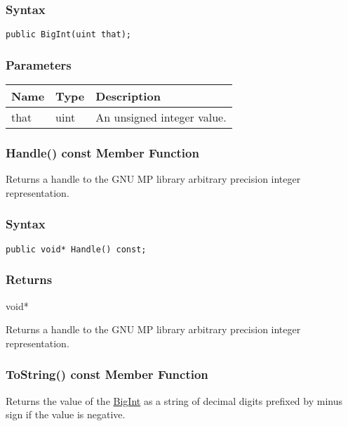 \documentclass[a4paper,oneside,11.000000pt]{book}
\begin{document}
\subsubsection*{Syntax}\texttt{public BigInt(uint that);}

\subsubsection*{Parameters}
\begin{flushleft}
\begin{supertabular}[l]{lll}
\textbf{Name}
& \textbf{Type}
& \textbf{Description}
\\
\hline
that
& uint
& An unsigned integer value.

\\
\end{supertabular}

\end{flushleft}
\clearpage

\hypertarget{System.Numerics.Multiprecision.BigInt.Handle.C.P.System.Numerics.Multiprecision.BigInt}{\subsubsection*{Handle() const Member Function}}
\begin{flushleft}
Returns a handle to the GNU MP library arbitrary precision integer representation.

\end{flushleft}
\subsubsection*{Syntax}\texttt{public void* Handle() const;}

\subsubsection*{Returns}void*
\begin{flushleft}
Returns a handle to the GNU MP library arbitrary precision integer representation.

\end{flushleft}
\clearpage

\hypertarget{System.Numerics.Multiprecision.BigInt.ToString.C.P.System.Numerics.Multiprecision.BigInt}{\subsubsection*{ToString() const Member Function}}
\begin{flushleft}
Returns the value of the \hyperlink{System.Numerics.Multiprecision.BigInt}{BigInt} as a string of decimal digits prefixed by minus sign if the value is negative.

\end{flushleft}
\end{document}
